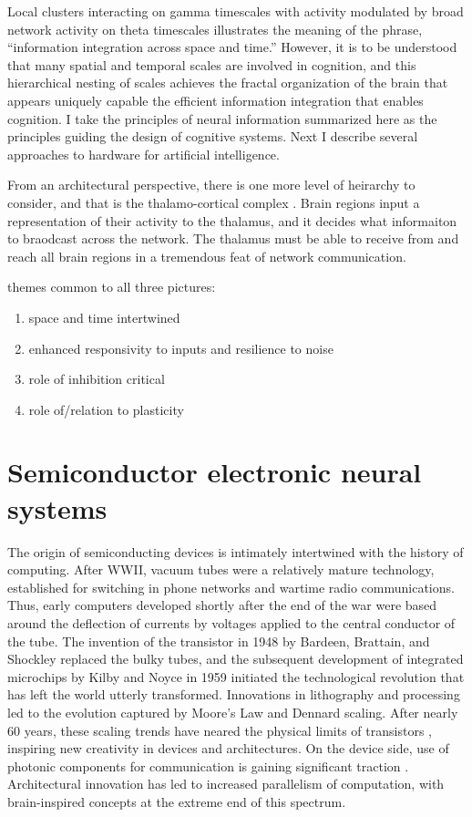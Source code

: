 \documentclass[twocolumn]{article}
\begin{document}
Local clusters interacting on gamma timescales with activity modulated by broad network activity on theta timescales illustrates the meaning of the phrase, ``information integration across space and time.'' However, it is to be understood that many spatial and temporal scales are involved in cognition, and this hierarchical nesting of scales achieves the fractal organization of the brain that appears uniquely capable the efficient information integration that enables cognition. I take the principles of neural information summarized here as the principles guiding the design of cognitive systems. Next I describe several approaches to hardware for artificial intelligence.

\vspace{3em}
From an architectural perspective, there is one more level of heirarchy to consider, and that is the thalamo-cortical complex \cite{}. Brain regions input a representation of their activity to the thalamus, and it decides what informaiton to braodcast across the network. The thalamus must be able to receive from and reach all brain regions in a tremendous feat of network communication.

\vspace{3em}
themes common to all three pictures:
\begin{enumerate}
\item space and time intertwined
\item enhanced responsivity to inputs and resilience to noise
\item role of inhibition critical
\item role of/relation to plasticity
\end{enumerate}



\section{\label{sec:electronics}Semiconductor electronic neural systems}
The origin of semiconducting devices is intimately intertwined with the history of computing. After WWII, vacuum tubes were a relatively mature technology, established for switching in phone networks and wartime radio communications. Thus, early computers developed shortly after the end of the war were based around the deflection of currents by voltages applied to the central conductor of the tube. The invention of the transistor in 1948 by Bardeen, Brattain, and Shockley replaced the bulky tubes, and the subsequent development of integrated microchips by Kilby and Noyce in 1959 initiated the technological revolution that has left the world utterly transformed. Innovations in lithography and processing led to the evolution captured by Moore's Law and Dennard scaling. After nearly 60 years, these scaling trends have neared the physical limits of transistors \cite{}, inspiring new creativity in devices and architectures. On the device side, use of photonic components for communication is gaining significant traction \cite{suwa2015,stra2018}. Architectural innovation has led to increased parallelism of computation, with brain-inspired concepts at the extreme end of this spectrum.
\end{document}
